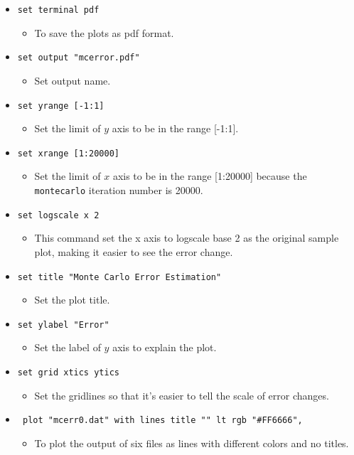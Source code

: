 \documentclass[12pt]{article}
\begin{document}
\begin{itemize}
   \item \texttt{set terminal pdf}
   \begin{itemize}
     \item To save the plots as pdf format.
   \end{itemize}
   \item \texttt{set output "mc\textunderscore error.pdf"}
   \begin{itemize}
     \item Set output name.
   \end{itemize}
   \item \texttt{set yrange [-1:1]}
   \begin{itemize}
     \item Set the limit of $y$ axis to be in the range [-1:1].
   \end{itemize}
   \item \texttt{set xrange [1:20000]}
   \begin{itemize}
     \item Set the limit of $x$ axis to be in the range [1:20000] because the \texttt{monte\textunderscore carlo} iteration number is 20000.
   \end{itemize}
   \item \texttt{set logscale x 2}
   \begin{itemize}
     \item This command set the x axis to logscale base 2 as the original sample plot, making it easier to see the error change.
   \end{itemize}
   \item \texttt{set title "Monte Carlo Error Estimation"}
   \begin{itemize}
     \item Set the plot title.
   \end{itemize}
   \item \texttt{set ylabel "Error"}
   \begin{itemize}
     \item Set the label of $y$ axis to explain the plot.
   \end{itemize}
   \item \texttt{set grid xtics ytics}
   \begin{itemize}
     \item Set the gridlines so that it's easier to tell the scale of error changes.
   \end{itemize}
   \item \texttt{ plot "mc\textunderscore err\textunderscore 0.dat" with lines title "" lt rgb "#FF6666",}
   \begin{itemize}
     \item To plot the output of six files as lines with different colors and no titles.
   \end{itemize}
 \end{itemize}
\end{document}
